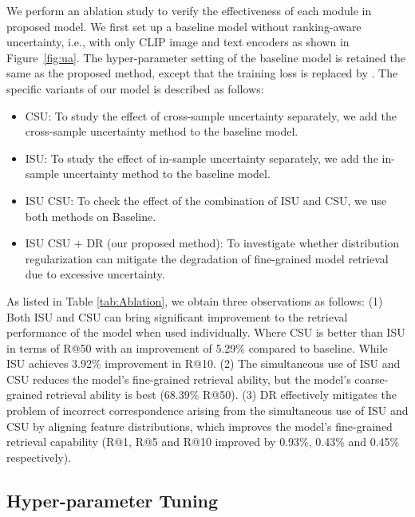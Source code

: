 \documentclass[letterpaper]{article} \usepackage{aaai24}  \usepackage{times}  \usepackage{helvet}  \usepackage{courier}  \usepackage[hyphens]{url}  \usepackage{graphicx} \urlstyle{rm} \def\UrlFont{\rm}  \usepackage{natbib}  \usepackage{caption} \frenchspacing  \setlength{\pdfpagewidth}{8.5in} \setlength{\pdfpageheight}{11in} \usepackage{amsmath,amsfonts}
\begin{document}
We perform an ablation study to verify the effectiveness of each module in proposed model. We first set up a baseline model without ranking-aware uncertainty, i.e., with only CLIP image and text encoders as shown in Figure~\ref{fig:ua}. The hyper-parameter setting of the baseline model is retained the same as the proposed method, except that the training loss is replaced by . The specific variants of our
model is described as follows:
\begin{itemize}
    \item  CSU: To study the effect of cross-sample uncertainty separately, we add the cross-sample uncertainty method to the baseline model.
    \item ISU: To study the effect of in-sample uncertainty separately, we add the in-sample uncertainty method to the baseline model.
    \item  ISU  CSU: To check the effect of the combination of ISU and CSU, we use both methods on Baseline.
    \item ISU  CSU + DR (our proposed method): To investigate whether distribution regularization can mitigate the degradation of fine-grained model retrieval due to excessive uncertainty.
\end{itemize}

As listed in Table \ref{tab:Ablation}, we obtain three observations as follows: (1) Both ISU and CSU can bring significant improvement to the retrieval performance of the model when used individually. Where CSU is better than ISU in terms of R@50 with an improvement of 5.29\% compared to baseline. While ISU achieves 3.92\% improvement in R@10. (2) The simultaneous use of ISU and CSU reduces the model's fine-grained retrieval ability, but the model's coarse-grained retrieval ability is best (68.39\% R@50). (3) DR effectively mitigates the problem of incorrect correspondence arising from the simultaneous use of ISU and CSU by aligning feature distributions, which improves the model's fine-grained retrieval capability (R@1, R@5 and R@10 improved by 0.93\%, 0.43\% and 0.45\% respectively).


\subsection{Hyper-parameter Tuning}
\end{document}
